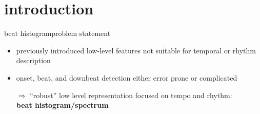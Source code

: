     \section[intro]{introduction}
        \begin{frame}{beat histogram}{problem statement}
            \begin{itemize}
                \item previously introduced low-level features not suitable for temporal or rhythm description
                \item   onset, beat, and downbeat detection either error prone or complicated
                \bigskip
                \item[$\Rightarrow$]   ``robust'' low level representation focused on tempo and rhythm:\\
                \smallskip
                \textbf{beat histogram/spectrum}
            \end{itemize}
        \end{frame}
        
